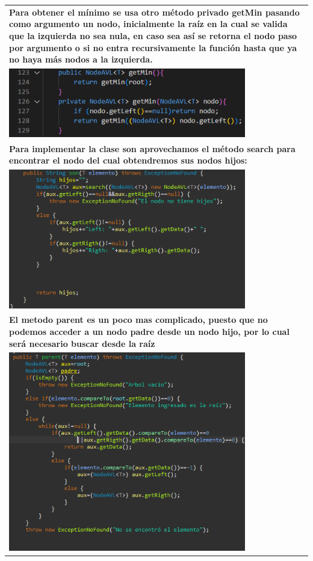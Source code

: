 \documentclass[9pt]{article}
\begin{document}
\begin{longtable}{|p{15cm}|}
		\textbf{Para obtener el mínimo se usa otro método privado getMin 
		pasando como argumento un nodo, inicialmente la raíz en la cual 
		se valida que la izquierda no sea nula, en caso sea así se retorna 
		el nodo paso por argumento o si no entra recursivamente  la función 
		hasta que ya no haya más nodos a la izquierda.}  \\
		\includegraphics[width=0.8\textwidth,keepaspectratio]{img/getMin.png}\\
		
		\textbf{Para implementar la clase son aprovechamos el método search para encontrar el nodo del cual obtendremos sus nodos hijos:}  \\
		\includegraphics[width=0.8\textwidth,keepaspectratio]{img/metodoSon.png}\\
		\textbf{El metodo parent es un poco mas complicado, puesto que no podemos acceder a un nodo padre desde un nodo hijo, por lo cual será necesario buscar desde la raíz}  \\
		\includegraphics[width=0.8\textwidth,keepaspectratio]{img/metodoParent.png}\\
	
		\hline
	\end{longtable}
\end{document}
